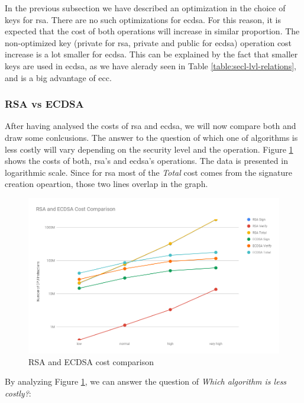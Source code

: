 \documentclass{llncs}
\begin{document}
In the previous subsection we have described an optimization in the choice of keys for \gls{rsa}. There are no such optimizations 
for \gls{ecdsa}. For this reason, it is expected that the cost of both operations will increase in similar proportion. The non-optimized
key (private for \gls{rsa}, private and public for \gls{ecdsa}) operation cost increase is a lot smaller for \gls{ecdsa}. This can be
explained by the fact that smaller keys are used in \gls{ecdsa}, as we have alerady seen in Table \ref{table:secl-lvl-relations}, and is a big advantage of \gls{ecc}.

\subsubsection{RSA vs ECDSA}

After having analysed the costs of \gls{rsa} and \gls{ecdsa}, we will now compare both and draw some conlcusions. The answer to the
question of which one of algorithms is less costly will vary depending on the security level and the operation. Figure \ref{fig:ecdsa-rsa-costs-all}
shows the costs of both, \gls{rsa}'s and \gls{ecdsa}'s operations. The data is presented in logarithmic scale. Since for \gls{rsa} most
of the \textit{Total} cost comes from the signature creation opeartion, those two lines overlap in the graph.

\begin{figure}
  \centering
  \includegraphics[width=1.0\textwidth]{img/rsa_ecdsa_costs_all.png}
  \caption{\label{fig:ecdsa-rsa-costs-all} RSA and ECDSA cost comparison}
\end{figure}

By analyzing Figure \ref{fig:ecdsa-rsa-costs-all}, we can answer the question of \textit{Which algorithm is less costly?}:
\end{document}
